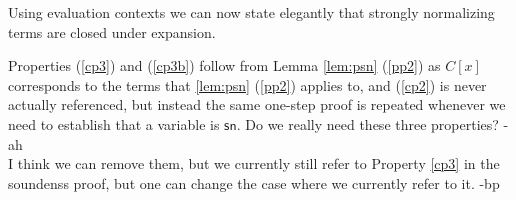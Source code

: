 \documentclass{article}
\newcommand{\csn}{\mathsf{sn}}
\newcommand{\red}{\longrightarrow}
\begin{document}
%

Using evaluation contexts we can now state elegantly that strongly normalizing terms are closed under expansion.

\begin{metanote}
	Properties (\ref{cp3}) and (\ref{cp3b}) follow from Lemma
        \ref{lem:psn} (\ref{pp2}) as $C[x]$ corresponds to the terms
        that \ref{lem:psn} (\ref{pp2}) applies to, and (\ref{cp2}) is
        never actually referenced, but instead the same one-step proof
        is repeated whenever we need to establish that a variable is
        $\csn$. Do we really need these three properties? -ah
\\[0.5em]
I think we can remove them, but we currently still refer to Property
\ref{cp3} in the soundenss proof, but one can change the case where we
currently refer to it. -bp
\end{metanote}
\end{document}
